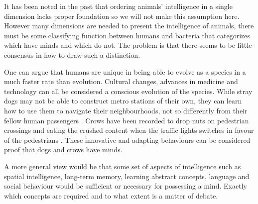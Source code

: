 \documentclass[11pt]{article}
\begin{document}
It has been noted in the past that ordering animals' intelligence in a single dimension lacks proper foundation \cite{mackintosh1988animals} so we will not make this assumption here. However many dimensions are needed to present the intelligence of animals, there must be some classifying function between humans and bacteria that categorizes which have minds and which do not. The problem is that there seems to be little consensus in how to draw such a distinction.

One can argue that humans are unique in being able to evolve as a species in a much faster rate than evolution. Cultural changes, advances in medicine and technology can all be considered a conscious evolution of the species. While stray dogs may not be able to construct metro stations of their own, they can learn how to use them to navigate their neighbourhoods, not so differently from their fellow human passengers \cite{moskowDogs}. Crows have been recorded to drop nuts on pedestrian crossings and eating the crushed content when the traffic lights switches in favour of the pedestrians \cite{crowNuts}. These innovative and adapting behaviours can be considered proof that dogs and crows have minds.


A more general view would be that some set of aspects of intelligence such as spatial intelligence, long-term memory, learning abstract concepts, language and social behaviour would be sufficient or necessary for possessing a mind. Exactly which concepts are required and to what extent is a matter of debate.

 
\end{document}
